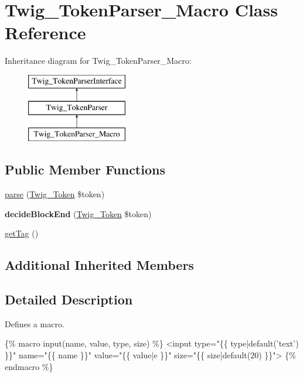 \hypertarget{classTwig__TokenParser__Macro}{}\section{Twig\+\_\+\+Token\+Parser\+\_\+\+Macro Class Reference}
\label{classTwig__TokenParser__Macro}
Inheritance diagram for Twig\+\_\+\+Token\+Parser\+\_\+\+Macro\+:\begin{figure}[H]
\begin{center}
\leavevmode
\includegraphics[height=3.000000cm]{classTwig__TokenParser__Macro}
\end{center}
\end{figure}
\subsection*{Public Member Functions}
\begin{DoxyCompactItemize}
\item 
\hyperlink{classTwig__TokenParser__Macro_a3bbc69dae299ae01ed993495124406c7}{parse} (\hyperlink{classTwig__Token}{Twig\+\_\+\+Token} \$token)
\item 
{\bfseries decide\+Block\+End} (\hyperlink{classTwig__Token}{Twig\+\_\+\+Token} \$token)\hypertarget{classTwig__TokenParser__Macro_ac9d04fd19536e30586c426c39cad5e25}{}\label{classTwig__TokenParser__Macro_ac9d04fd19536e30586c426c39cad5e25}

\item 
\hyperlink{classTwig__TokenParser__Macro_a62a90a2cf846a401b265d73aae99791a}{get\+Tag} ()
\end{DoxyCompactItemize}
\subsection*{Additional Inherited Members}


\subsection{Detailed Description}
Defines a macro.


\begin{DoxyPre}
\{\% macro input(name, value, type, size) \%\}
   <input type="\{\{ type|default('text') \}\}" name="\{\{ name \}\}" value="\{\{ value|e \}\}" size="\{\{ size|default(20) \}\}">
\{\% endmacro \%\}
\end{DoxyPre}
 

